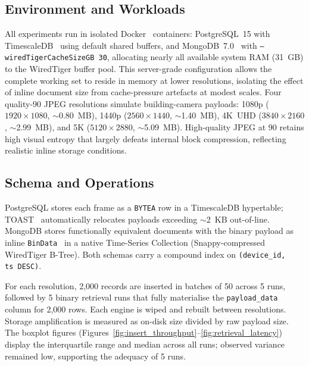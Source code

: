 \documentclass[conference]{IEEEtran}
\begin{document}
\subsection{Environment and Workloads}
All experiments run in isolated Docker~\cite{docker_official} containers: PostgreSQL~15 with TimescaleDB~\cite{timescaledb_official} using default shared buffers, and MongoDB~7.0~\cite{mongodb_official} with \texttt{--wiredTigerCacheSizeGB~30}, allocating nearly all available system RAM (31~GB) to the WiredTiger buffer pool. This server-grade configuration allows the complete working set to reside in memory at lower resolutions, isolating the effect of inline document size from cache-pressure artefacts at modest scales. Four quality-90 JPEG resolutions simulate building-camera payloads: 1080p ($1920{\times}1080$, $\sim$0.80~MB), 1440p ($2560{\times}1440$, $\sim$1.40~MB), 4K~UHD ($3840{\times}2160$, $\sim$2.99~MB), and 5K ($5120{\times}2880$, $\sim$5.09~MB). High-quality JPEG at 90 retains high visual entropy that largely defeats internal block compression, reflecting realistic inline storage conditions.

\subsection{Schema and Operations}
PostgreSQL stores each frame as a \texttt{BYTEA} row in a TimescaleDB hypertable; TOAST~\cite{postgresql_toast_docs} automatically relocates payloads exceeding $\sim$2~KB out-of-line. MongoDB stores functionally equivalent documents with the binary payload as inline \texttt{BinData}~\cite{mongodb_bson_spec} in a native Time-Series Collection (Snappy-compressed WiredTiger B-Tree). Both schemas carry a compound index on \texttt{(device\_id, ts~DESC)}.

For each resolution, 2,000 records are inserted in batches of 50 across 5 runs, followed by 5 binary retrieval runs that fully materialise the \texttt{payload\_data} column for 2,000 rows. Each engine is wiped and rebuilt between resolutions. Storage amplification is measured as on-disk size divided by raw payload size. The boxplot figures (Figures~\ref{fig:insert_throughput}--\ref{fig:retrieval_latency}) display the interquartile range and median across all runs; observed variance remained low, supporting the adequacy of 5 runs.
\end{document}
